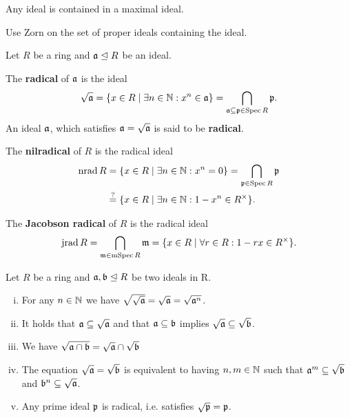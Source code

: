 	\begin{lemma}
		Any ideal is contained in a maximal ideal.
	\end{lemma}
	\begin{sketch}
		Use Zorn on the set of proper ideals containing the ideal.
	\end{sketch}

	\begin{definition}
		Let $R$ be a ring and $\mathfrak{a} \trianglelefteq R$ be an ideal. 

		The \textbf{radical} of $\mathfrak{a}$ is the ideal 
		\begin{equation*}
			\sqrt{\mathfrak{a}} = \{x \in R \mid \exists n \in \mathbb{N}: x^n \in \mathfrak{a}\} = \bigcap \limits_{\mathfrak{a} \subseteq \mathfrak{p} \in \operatorname{Spec} R} \mathfrak{p}.
		\end{equation*}
		An ideal $\mathfrak{a}$, which satisfies $\mathfrak{a} = \sqrt{\mathfrak{a}}$ is said to be \textbf{radical}.

		The \textbf{nilradical} of $R$ is the radical ideal
		\begin{align*}
			\operatorname{nrad} R &= \{x \in R \mid \exists n \in \mathbb{N}: x^n = 0\} = \bigcap \limits_{\mathfrak{p} \in \operatorname{Spec} R} \mathfrak{p}\\
			& \overset{?}{=} \{x \in R \mid \exists n \in \mathbb{N}: 1 - x^n \in R^\times\}.
		\end{align*}

		The \textbf{Jacobson radical} of $R$ is the radical ideal
		\begin{equation*}
			\operatorname{jrad} R = \bigcap \limits_{\mathfrak{m} \in \operatorname{mSpec} R} \mathfrak{m} = \{x \in R \mid \forall r \in R: 1 - rx \in R^\times\}.
		\end{equation*}
	\end{definition}

	\begin{lemma}
		Let $R$ be a ring and $\mathfrak{a},\mathfrak{b} \trianglelefteq R$ be two ideals in R.
		\begin{enumerate}[(i)]
			\item{
				For any $n \in \mathbb{N}$ we have $\sqrt{\sqrt{\mathfrak{a}}} = \sqrt{\mathfrak{a}} = \sqrt{\mathfrak{a}^n}$.
			}
			\item{
				It holds that $\mathfrak{a} \subseteq \sqrt{\mathfrak{a}}$ and that $\mathfrak{a} \subseteq \mathfrak{b}$ implies $\sqrt{\mathfrak{a}} \subseteq \sqrt{\mathfrak{b}}$.
			}
			\item{
				We have $\sqrt{\mathfrak{a} \cap \mathfrak{b}} = \sqrt{\mathfrak{a}} \cap \sqrt{\mathfrak{b}}$
			}
			\item{
				The equation $\sqrt{\mathfrak{a}} = \sqrt{\mathfrak{b}}$ is equivalent to having $n,m \in \mathbb{N}$ such that $\mathfrak{a}^m \subseteq \sqrt{\mathfrak{b}}$ and $\mathfrak{b}^n \subseteq \sqrt{\mathfrak{a}}$.
			}
			\item{
				Any prime ideal $\mathfrak{p}$ is radical, i.e. satisfies $\sqrt{\mathfrak{p}} = \mathfrak{p}$.
			}
		\end{enumerate}
	\end{lemma}

